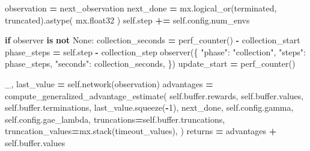 \documentclass[
  chinese,
  11pt,
  letterpaper,
]{article}
\newenvironment{Shaded}{\begin{snugshade}}{\end{snugshade}}
\newcommand{\BuiltInTok}[1]{#1}
\newcommand{\ControlFlowTok}[1]{\textcolor[rgb]{0.13,0.29,0.53}{\textbf{#1}}}
\newcommand{\DecValTok}[1]{\textcolor[rgb]{0.00,0.00,0.81}{#1}}
\newcommand{\KeywordTok}[1]{\textcolor[rgb]{0.13,0.29,0.53}{\textbf{#1}}}
\newcommand{\NormalTok}[1]{#1}
\newcommand{\OperatorTok}[1]{\textcolor[rgb]{0.81,0.36,0.00}{\textbf{#1}}}
\newcommand{\StringTok}[1]{\textcolor[rgb]{0.31,0.60,0.02}{#1}}
\newcommand{\VariableTok}[1]{\textcolor[rgb]{0.00,0.00,0.00}{#1}}
\renewenvironment{Shaded}{\par\smallskip}{\par\smallskip}
\begin{document}
\begin{Shaded}
\begin{Highlighting}[]
\NormalTok{                observation }\OperatorTok{=}\NormalTok{ next\_observation}
\NormalTok{                next\_done }\OperatorTok{=}\NormalTok{ mx.logical\_or(terminated, truncated).astype(}
\NormalTok{                    mx.float32}
\NormalTok{                )}
                \VariableTok{self}\NormalTok{.step }\OperatorTok{+=} \VariableTok{self}\NormalTok{.config.num\_envs}

            \ControlFlowTok{if}\NormalTok{ observer }\KeywordTok{is} \KeywordTok{not} \VariableTok{None}\NormalTok{:}
\NormalTok{                collection\_seconds }\OperatorTok{=}\NormalTok{ perf\_counter() }\OperatorTok{{-}}\NormalTok{ collection\_start}
\NormalTok{                phase\_steps }\OperatorTok{=} \VariableTok{self}\NormalTok{.step }\OperatorTok{{-}}\NormalTok{ collection\_step}
\NormalTok{                observer(\{}
                    \StringTok{"phase"}\NormalTok{: }\StringTok{"collection"}\NormalTok{,}
                    \StringTok{"steps"}\NormalTok{: phase\_steps,}
                    \StringTok{"seconds"}\NormalTok{: collection\_seconds,}
\NormalTok{                \})}
\NormalTok{                update\_start }\OperatorTok{=}\NormalTok{ perf\_counter()}

\NormalTok{            \_, last\_value }\OperatorTok{=} \VariableTok{self}\NormalTok{.network(observation)}
\NormalTok{            advantages }\OperatorTok{=}\NormalTok{ compute\_generalized\_advantage\_estimate(}
                \VariableTok{self}\NormalTok{.}\BuiltInTok{buffer}\NormalTok{.rewards,}
                \VariableTok{self}\NormalTok{.}\BuiltInTok{buffer}\NormalTok{.values,}
                \VariableTok{self}\NormalTok{.}\BuiltInTok{buffer}\NormalTok{.terminations,}
\NormalTok{                last\_value.squeeze(}\OperatorTok{{-}}\DecValTok{1}\NormalTok{),}
\NormalTok{                next\_done,}
                \VariableTok{self}\NormalTok{.config.gamma,}
                \VariableTok{self}\NormalTok{.config.gae\_lambda,}
\NormalTok{                truncations}\OperatorTok{=}\VariableTok{self}\NormalTok{.}\BuiltInTok{buffer}\NormalTok{.truncations,}
\NormalTok{                truncation\_values}\OperatorTok{=}\NormalTok{mx.stack(timeout\_values),}
\NormalTok{            )}
\NormalTok{            returns }\OperatorTok{=}\NormalTok{ advantages }\OperatorTok{+} \VariableTok{self}\NormalTok{.}\BuiltInTok{buffer}\NormalTok{.values}


\end{Highlighting}
\end{Shaded}
\end{document}

